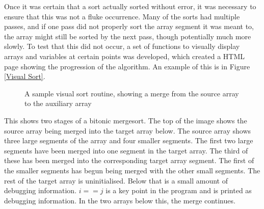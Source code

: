 Once it was certain that a sort actually sorted without error, it was necessary
to ensure that this was not a fluke occurrence. Many of the sorts had multiple
passes, and if one pass did not properly sort the array segment it was meant to,
the array might still be sorted by the next pass, though potentially much more
slowly. To test that this did not occur, a set of functions to visually display
arrays and variables at certain points was developed, which created a HTML page
showing the progression of the algorithm. An example of this is in Figure
\vref{Visual Sort}.

\begin{figure}
\caption{A sample visual sort routine, showing a merge from the source array to
the auxiliary array}
\label{Visual Sort}
\end{figure}

This shows two stages of a bitonic mergesort. The top of the image shows the
source array being merged into the target array below. The source array shows
three large segments of the array and four smaller segments. The first two large
segments have been merged into one segment in the target array. The third of
these has been merged into the corresponding target array segment. The first of
the smaller segments has begun being merged with the other small segments. The
rest of the target array is uninitialised.  Below that is a small amount of
debugging information. $i == j$ is a key point in the program and is printed as
debugging information. In the two arrays below this, the merge continues.

